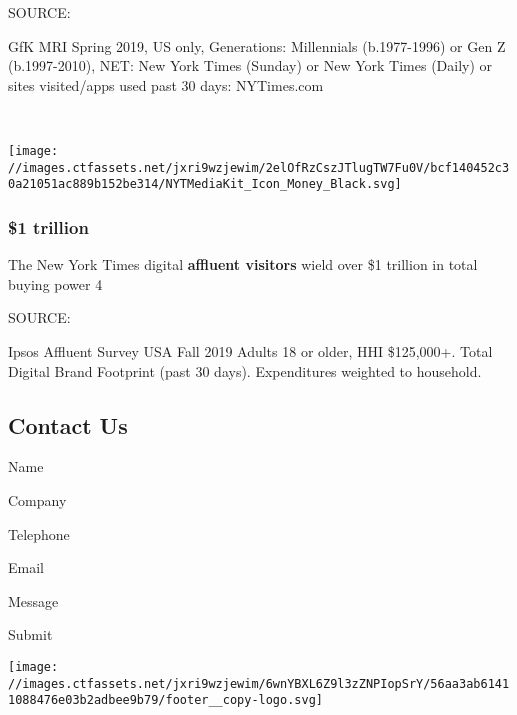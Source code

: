 SOURCE:

GfK MRI Spring 2019, US only, Generations: Millennials (b.1977-1996) or
Gen Z (b.1997-2010), NET: New York Times (Sunday) or New York Times
(Daily) or sites visited/apps used past 30 days: NYTimes.com

﻿

\texttt{[image: //images.ctfassets.net/jxri9wzjewim/2elOfRzCszJTlugTW7Fu0V/bcf140452c30a21051ac889b152be314/NYTMediaKit\_Icon\_Money\_Black.svg]}

\hypertarget{1-trillion}{%
\subsubsection{\$1 trillion}\label{1-trillion}}

The New York Times digital \textbf{affluent visitors} wield over \$1
trillion in total buying power 4

SOURCE:

Ipsos Affluent Survey USA Fall 2019 Adults 18 or older, HHI \$125,000+.
Total Digital Brand Footprint (past 30 days). Expenditures weighted to
household.

\hypertarget{contact-us}{%
\subsection{Contact Us}\label{contact-us}}

Name

Company

Telephone

Email

Message

Submit

\texttt{[image: //images.ctfassets.net/jxri9wzjewim/6wnYBXL6Z9l3zZNPIopSrY/56aa3ab61411088476e03b2adbee9b79/footer\_\_copy-logo.svg]}

